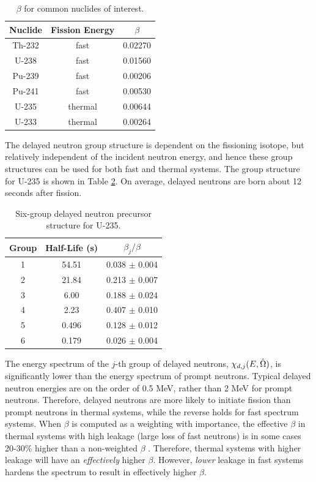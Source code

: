\begin{table}[H] 
\caption{\(\beta\) for common nuclides of interest.}
\centering
\begin{tabular}{c c c}
\hline\hline
Nuclide & Fission Energy & \(\beta\)\\
\hline
Th-232 & fast & 0.02270\\
U-238 & fast  & 0.01560\\
Pu-239 & fast & 0.00206\\
Pu-241 & fast & 0.00530 \\
U-235 & thermal & 0.00644 \\
U-233 & thermal & 0.00264 \\
\hline
\end{tabular}
\label{table:beta}
\end{table}

The delayed neutron group structure is dependent on the fissioning isotope, but relatively independent of the incident neutron energy, and hence these group structures can be used for both fast and thermal systems. The group structure for U-235 is shown in Table \ref{table:U235_delayed}. On average, delayed neutrons are born about 12 seconds after fission. 

\begin{table}[H]
\caption{Six-group delayed neutron precursor structure for U-235.}
\centering
\begin{tabular}{c c c}
\hline\hline
Group & Half-Life (s) & \(\beta_j/\beta\)\\ [0.5ex]
\hline
1 & 54.51 & 0.038 \(\pm\) 0.004\\
2 & 21.84 & 0.213 \(\pm\) 0.007\\
3 & 6.00 & 0.188 \(\pm\) 0.024\\
4 & 2.23 & 0.407 \(\pm\) 0.010\\
5 & 0.496 & 0.128 \(\pm\) 0.012\\
6 & 0.179 & 0.026 \(\pm\) 0.004\\
\hline
\end{tabular}
\label{table:U235_delayed}
\end{table}

The energy spectrum of the \(j\)-th group of delayed neutrons, \(\chi_{d,j}(E,\hat{\Omega})\), is significantly lower than the energy spectrum of prompt neutrons. Typical delayed neutron energies are on the order of 0.5 MeV, rather than 2 MeV for prompt neutrons. Therefore, delayed neutrons are more likely to initiate fission than prompt neutrons in thermal systems, while the reverse holds for fast spectrum systems. When \(\beta\) is computed as a weighting with importance, the effective \(\beta\) in thermal systems with high leakage (large loss of fast neutrons) is in some cases 20-30\% higher than a non-weighted \(\beta\) \cite{duderstadt}. Therefore, thermal systems with higher leakage will have an {\it effectively} higher \(\beta\). However, {\it lower} leakage in fast systems hardens the spectrum to result in effectively higher \(\beta\).

